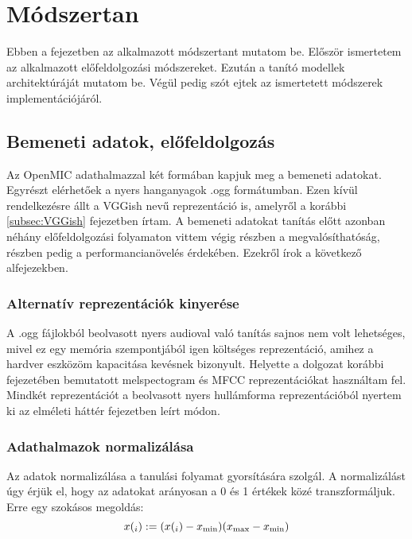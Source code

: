 \chapter{Módszertan} 
\label{ch:methodology}

Ebben a fejezetben az alkalmazott módszertant mutatom be. Először ismertetem az alkalmazott előfeldolgozási módszereket. Ezután a tanító modellek architektúráját mutatom be. Végül pedig szót ejtek az ismertetett módszerek implementációjáról.

\section{Bemeneti adatok, előfeldolgozás}

Az OpenMIC adathalmazzal két formában kapjuk meg a bemeneti adatokat. Egyrészt elérhetőek a nyers hanganyagok .ogg formátumban. Ezen kívül rendelkezésre állt a VGGish nevű reprezentáció is, amelyről a korábbi \ref{subsec:VGGish} fejezetben írtam. A bemeneti adatokat tanítás előtt azonban néhány előfeldolgozási folyamaton vittem végig részben a megvalósíthatóság, részben pedig a performancianövelés érdekében. Ezekről írok a következő alfejezekben.

\subsection{Alternatív reprezentációk kinyerése}

A .ogg fájlokból beolvasott nyers audioval való tanítás sajnos nem volt lehetséges, mivel ez egy memória szempontjából igen költséges reprezentáció, amihez a hardver eszközöm kapacitása kevésnek bizonyult. Helyette a dolgozat korábbi fejezetében bemutatott melspectogram és MFCC reprezentációkat használtam fel. Mindkét reprezentációt a beolvasott nyers hullámforma reprezentációból nyertem ki az elméleti háttér fejezetben leírt módon.

\subsection{Adathalmazok normalizálása}

Az adatok normalizálása a tanulási folyamat gyorsítására szolgál. A normalizálást úgy érjük el, hogy az adatokat arányosan a 0 és 1 értékek közé transzformáljuk. Erre egy szokásos megoldás:
\begin{equation}
x(_i) := (x(_i) - x_{\text{min}}) \/ (x_{\text{max}} - x_{\text{min}})
\end{equation}

